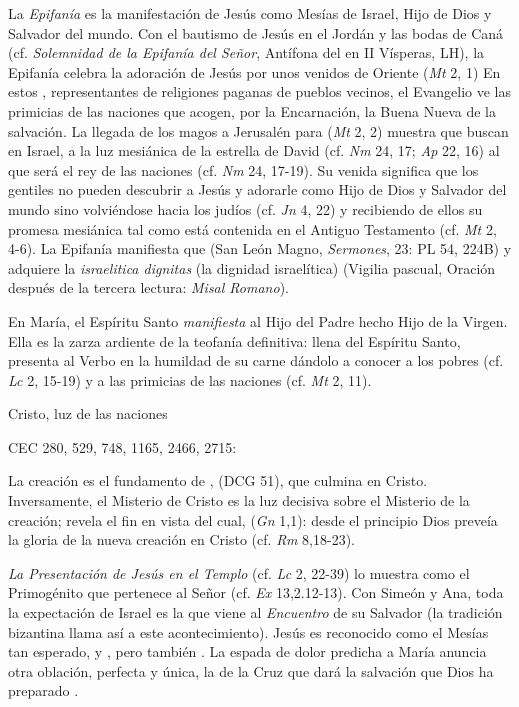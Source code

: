 	 La \emph{Epifanía} es la manifestación de Jesús como Mesías de Israel, Hijo de Dios y Salvador del mundo. Con el bautismo de Jesús en el Jordán y las bodas de Caná (cf. \emph{Solemnidad de la Epifanía del Señor}, Antífona del  en II Vísperas, LH), la Epifanía celebra la adoración de Jesús por unos  venidos de Oriente (\emph{Mt} 2, 1) En estos , representantes de religiones paganas de pueblos vecinos, el Evangelio ve las primicias de las naciones que acogen, por la Encarnación, la Buena Nueva de la salvación. La llegada de los magos a Jerusalén para  (\emph{Mt} 2, 2) muestra que buscan en Israel, a la luz mesiánica de la estrella de David (cf. \emph{Nm} 24, 17; \emph{Ap} 22, 16) al que será el rey de las naciones (cf. \emph{Nm} 24, 17-19). Su venida significa que los gentiles no pueden descubrir a Jesús y adorarle como Hijo de Dios y Salvador del mundo sino volviéndose hacia los judíos (cf. \emph{Jn} 4, 22) y recibiendo de ellos su promesa mesiánica tal como está contenida en el Antiguo Testamento (cf. \emph{Mt} 2, 4-6). La Epifanía manifiesta que  (San León Magno, \emph{Sermones}, 23: PL 54, 224B) y adquiere la \emph{israelitica dignitas} (la dignidad israelítica) (Vigilia pascual, Oración después de la tercera lectura: \emph{Misal Romano}).
	
	 En María, el Espíritu Santo \emph{manifiesta} al Hijo del Padre hecho Hijo de la Virgen. Ella es la zarza ardiente de la teofanía definitiva: llena del Espíritu Santo, presenta al Verbo en la humildad de su carne dándolo a conocer a los pobres (cf. \emph{Lc} 2, 15-19) y a las primicias de las naciones (cf. \emph{Mt} 2, 11).
	
	Cristo, luz de las naciones
	
	CEC 280, 529, 748, 1165, 2466, 2715:
	
	 La creación es el fundamento de ,  (DCG 51), que culmina en Cristo. Inversamente, el Misterio de Cristo es la luz decisiva sobre el Misterio de la creación; revela el fin en vista del cual,  (\emph{Gn} 1,1): desde el principio Dios preveía la gloria de la nueva creación en Cristo (cf. \emph{Rm} 8,18-23).
	
	 \emph{La Presentación de Jesús en el Templo} (cf. \emph{Lc} 2, 22-39) lo muestra como el Primogénito que pertenece al Señor (cf. \emph{Ex} 13,2.12-13). Con Simeón y Ana, toda la expectación de Israel es la que viene al \emph{Encuentro} de su Salvador (la tradición bizantina llama así a este acontecimiento). Jesús es reconocido como el Mesías tan esperado,  y , pero también . La espada de dolor predicha a María anuncia otra oblación, perfecta y única, la de la Cruz que dará la salvación que Dios ha preparado .
	
